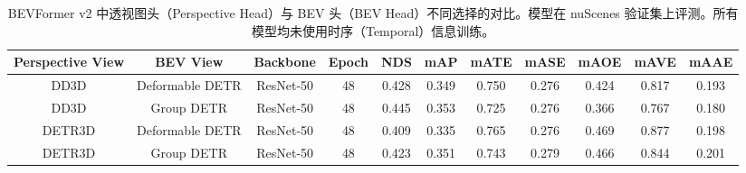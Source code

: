 \setlength{\tabcolsep}{3pt}
\setlength{\doublerulesep}{2\arrayrulewidth}
\renewcommand{\arraystretch}{1.1}
\begin{table}[ht]
    \caption{BEVFormer v2 中透视图头（Perspective Head）与 BEV 头（BEV Head）不同选择的对比。模型在 nuScenes 验证集上评测。所有模型均未使用时序（Temporal）信息训练。}
    \label{table:detector_choice_for_two_view}
    \centering
    \vspace{-5pt}
    \begin{tabular}{cc|c|c|cc|ccccc}
        \toprule
        Perspective View & BEV View & Backbone & Epoch & NDS & mAP & mATE & mASE & mAOE & mAVE & mAAE   \\ 
        \midrule 
        DD3D & Deformable DETR & ResNet-50 & 48 & 0.428 & 0.349 & 0.750 & 0.276 & 0.424 & 0.817 & 0.193 \\ 
        DD3D & Group DETR & ResNet-50 & 48 & 0.445 & 0.353 & 0.725 & 0.276 & 0.366 & 0.767 & 0.180 \\ 
         DETR3D & Deformable DETR & ResNet-50 & 48 & 0.409 & 0.335 & 0.765 & 0.276 & 0.469 & 0.877 & 0.198 \\ 
        DETR3D & Group DETR & ResNet-50 & 48 & 0.423 & 0.351 & 0.743 & 0.279 & 0.466 & 0.844 & 0.201 \\ 
        \midrule
        \bottomrule
    \end{tabular}
    
\end{table}
